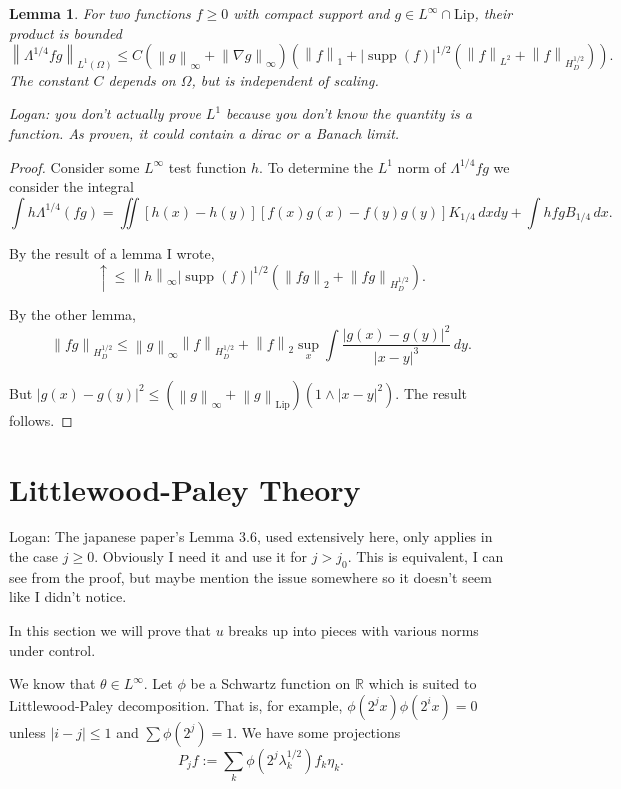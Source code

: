 \documentclass[11pt]{amsart}
\newtheorem{lemma}[theorem]{Lemma}
\theoremstyle{remark}
\theoremstyle{definition}
\newcommand{\R}{\mathbb{R}}
\newcommand{\norm}[1]{\left\lVert#1\right\rVert}
\newcommand{\paren}[1]{\left( #1 \right)}
\DeclareMathOperator{\supp}{supp}
\newcommand{\grad}{\nabla}
\newcommand{\Lip}{\text{Lip}}
\newcommand{\eigen}[1]{\eta_{#1}} %
\begin{document}
\begin{lemma} \label{thm:weak product rule}
For two functions $f \geq 0$ with compact support and $g \in L^\infty \cap \Lip$, their product is bounded
\[ \norm{\Lambda^{1/4} fg}_{L^1(\Omega)} \leq C \paren{\norm{g}_\infty + \norm{\grad g}_\infty} \paren{\norm{f}_1 + |\supp(f)|^{1/2} \paren{ \norm{f}_{L^2} + \norm{f}_{H_D^{1/2}}}}. \]
The constant $C$ depends on $\Omega$, but is independent of scaling.  

Logan: you don't actually prove $L^1$ because you don't know the quantity is a function.  As proven, it could contain a dirac or a Banach limit. 
\end{lemma}

\begin{proof}
Consider some $L^\infty$ test function $h$.  To determine the $L^1$ norm of $\Lambda^{1/4} fg$ we consider the integral
\[ \int h \Lambda^{1/4} (fg) = \iint [h(x)-h(y)][f(x)g(x) - f(y)g(y)] K_{1/4} \,dxdy + \int hfg B_{1/4} \,dx. \]

By the result of a lemma I wrote,
\[ \uparrow \leq \norm{h}_\infty |\supp(f)|^{1/2} \paren{\norm{fg}_2 + \norm{fg}_{H_D^{1/2}} }. \]

By the other lemma,
\[ \norm{fg}_{H_D^{1/2}} \leq \norm{g}_\infty \norm{f}_{H_D^{1/2}} + \norm{f}_2 \sup_x \int \frac{|g(x)-g(y)|^2}{|x-y|^3} \,dy. \]

But $|g(x)-g(y)|^2 \leq (\norm{g}_\infty + \norm{g}_\Lip) (1 \wedge |x-y|^2)$.  The result follows.  
\end{proof}


\section{Littlewood-Paley Theory} \label{sec:littlewood paley}

Logan: The japanese paper's Lemma 3.6, used extensively here, only applies in the case $j \geq 0$. Obviously I need it and use it for $j > j_0$.  This is equivalent, I can see from the proof, but maybe mention the issue somewhere so it doesn't seem like I didn't notice.  

In this section we will prove that $u$ breaks up into pieces with various norms under control.  

We know that $\theta \in L^\infty$.  Let $\phi$ be a Schwartz function on $\R$ which is suited to Littlewood-Paley decomposition.  That is, for example, $\phi(2^j x) \phi(2^i x) = 0$ unless $|i-j|\leq 1$ and $\sum \phi(2^j) = 1$.  We have some projections 
\[ P_j f := \sum_k \phi(2^j \lambda_k^{1/2}) f_k \eigen{k}. \]
\end{document}
